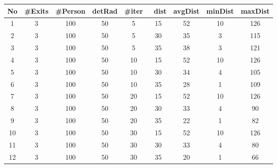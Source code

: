 \begin{table}[h]
\begin{tabular}{|c|c|c|c|c|c|c|c|c|}
\hline
\textbf{No} & \textbf{\#Exits} & \textbf{\#Person} & \textbf{detRad} & \textbf{\#iter} & \textbf{~dist} & \textbf{avgDist} & \textbf{minDist} & \textbf{maxDist} \\ \hline
1           & 3                & 100               & 50              & 5               & 15             & 52               & 10               & 126              \\ \hline
2           & 3                & 100               & 50              & 5               & 30             & 35               & 3                & 115              \\ \hline
3           & 3                & 100               & 50              & 5               & 35             & 38               & 3                & 121              \\ \hline
4           & 3                & 100               & 50              & 10              & 15             & 52               & 10               & 126              \\ \hline
5           & 3                & 100               & 50              & 10              & 30             & 34               & 4                & 105              \\ \hline
6           & 3                & 100               & 50              & 10              & 35             & 28               & 1                & 109              \\ \hline
7           & 3                & 100               & 50              & 20              & 15             & 52               & 10               & 126              \\ \hline
8           & 3                & 100               & 50              & 20              & 30             & 33               & 4                & 90               \\ \hline
9           & 3                & 100               & 50              & 20              & 35             & 22               & 1                & 82               \\ \hline
10          & 3                & 100               & 50              & 30              & 15             & 52               & 10               & 126              \\ \hline
11          & 3                & 100               & 50              & 30              & 30             & 33               & 4                & 80               \\ \hline
12          & 3                & 100               & 50              & 30              & 35             & 20               & 1                & 66               \\ \hline
\end{tabular}
\end{table}

